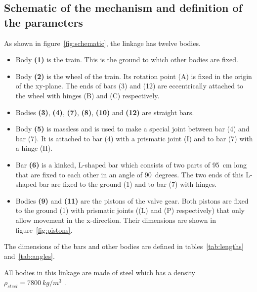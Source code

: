 \documentclass[a4paper]{article}
\begin{document}
\subsection{Schematic of the mechanism and definition of the parameters}

As shown in figure~\ref{fig:schematic}, the linkage has twelve bodies.

\begin{itemize}
	\item Body \textbf{(1)} is the train. This is the ground to which other bodies are fixed.
	\item Body \textbf{(2)} is the wheel of the train. Its rotation point (A) is fixed in the origin of the xy-plane. The ends of bars (3) and (12) are eccentrically attached to the wheel with hinges (B) and (C) respectively.
	\item Bodies \textbf{(3)}, \textbf{(4)}, \textbf{(7)}, \textbf{(8)}, \textbf{(10)} and \textbf{(12)} are straight bars.
	\item Body \textbf{(5)} is massless and is used to make a special joint between bar (4) and bar (7). It is attached to bar (4) with a prismatic joint (I) and to bar (7) with a hinge (H).
	\item Bar \textbf{(6)} is a kinked, L-shaped bar which consists of two parts of 95~\si{cm} long that are fixed to each other in an angle of 90~\si{degrees}. The two ends of this L-shaped bar are fixed to the ground (1) and to bar (7) with hinges.
	\item Bodies \textbf{(9)} and \textbf{(11)} are the pistons of the valve gear. Both pistons are fixed to the ground (1) with prismatic joints ((L) and (P) respectively) that only allow movement in the x-direction. Their dimensions are shown in figure~\ref{fig:pistons}.
\end{itemize}

The dimensions of the bars and other bodies are defined in tables~\ref{tab:lengths} and~\ref{tab:angles}.

All bodies in this linkage are made of steel which has a density \(\rho_{steel} = 7800~\si{kg/m^3}\) \cite{steel1}.
\end{document}
